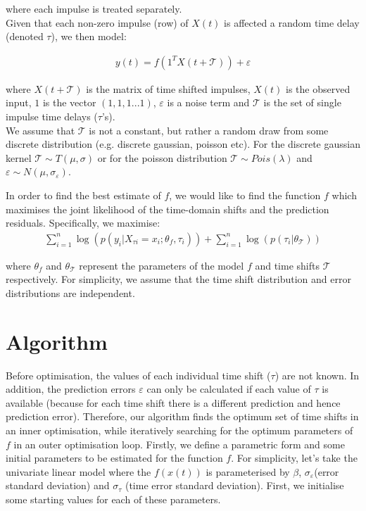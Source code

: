 \documentclass[11pt]{amsart}
\begin{document}
where each impulse is treated separately. \\

Given that each non-zero impulse (row) of $X(t)$ is affected a random time delay (denoted $\tau$), we then model:

\begin{align}
y(t)= f(1^TX(t + \mathcal{T})) + \varepsilon
\end{align}

where $X(t + \mathcal{T})$ is the matrix of time shifted impulses, 
 $X(t)$ is the observed input, 
 $1$ is the vector $(1,1,1...1)$,
 $\varepsilon$ is a noise term and $\mathcal{T}$ is the set of single impulse time delays ($\tau$'s).\\

We assume that $\mathcal{T}$ is not a constant, but rather a random draw from some discrete distribution (e.g. discrete gaussian, poisson etc). For the discrete gaussian kernel $\mathcal{T}\sim T(\mu, \sigma)$ or for the poisson distribution $\mathcal{T}\sim Pois(\lambda)$ and $\varepsilon \sim N(\mu, \sigma_{\varepsilon})$. 


In order to find the best estimate of $f$, we would like to find the function $f$ which maximises the joint likelihood of the time-domain shifts and the prediction residuals. Specifically, we maximise:
\begin{align}
    \sum_{i=1}^{n} \log(p(y_i | X_{\tau i} = x_i; \theta_{f}, \tau_i)) + \sum_{i=1}^{n} \log(p(\tau_i| \theta_{\mathcal{T}}))
\end{align}

where $\theta_{f}$ and $\theta_{\mathcal{T}}$ represent the parameters of the model $f$ and time shifts $\mathcal{T}$ respectively. For simplicity, we assume that the time shift distribution and error distributions are independent. 

\section{Algorithm}

Before optimisation, the values of each individual time shift ($\tau$) are not known. In addition, the prediction errors $\varepsilon$ can only be calculated if each value of $\tau$ is available (because for each time shift there is a different prediction and hence prediction error). Therefore, our algorithm finds the optimum set of time shifts in an inner optimisation, while iteratively searching for the optimum parameters of $f$ in an outer optimisation loop. 
Firstly, we define a parametric form and some initial parameters to be estimated for the function $f$. For simplicity, let's take the univariate linear model where the $f(x(t))$ is parameterised by $\beta$, $\sigma_{\varepsilon}$(error standard deviation)  and $\sigma_{\tau}$ (time error standard deviation). First, we initialise some starting values for each of these parameters.
\end{document}
